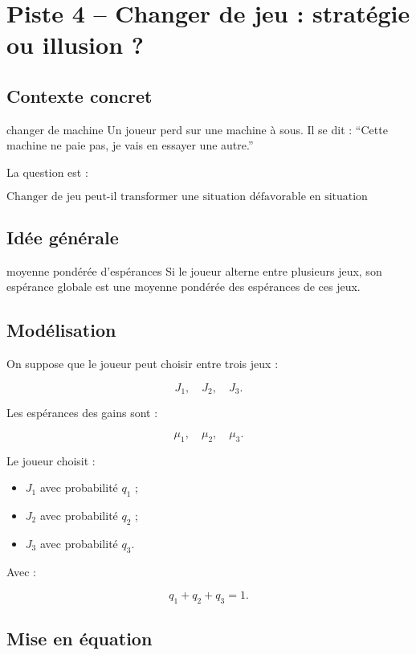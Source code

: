 \documentclass[11pt,a4paper]{article}
\begin{document}
\section{Piste 4 -- Changer de jeu : stratégie ou illusion ?}

\subsection{Contexte concret}

\begin{contexte}{changer de machine}
Un joueur perd sur une machine à sous. Il se dit : ``Cette machine ne paie pas, je vais en essayer une autre.''

La question est :

\[
\text{Changer de jeu peut-il transformer une situation défavorable en situation favorable ?}
\]
\end{contexte}

\subsection{Idée générale}

\begin{idee}{moyenne pondérée d'espérances}
Si le joueur alterne entre plusieurs jeux, son espérance globale est une moyenne pondérée des espérances de ces jeux.
\end{idee}

\subsection{Modélisation}

On suppose que le joueur peut choisir entre trois jeux :

\[
J_1,\quad J_2,\quad J_3.
\]

Les espérances des gains sont :

\[
\mu_1,\quad \mu_2,\quad \mu_3.
\]

Le joueur choisit :
\begin{itemize}
    \item $J_1$ avec probabilité $q_1$ ;
    \item $J_2$ avec probabilité $q_2$ ;
    \item $J_3$ avec probabilité $q_3$.
\end{itemize}

Avec :

\[
q_1+q_2+q_3=1.
\]

\subsection{Mise en équation}
\end{document}
